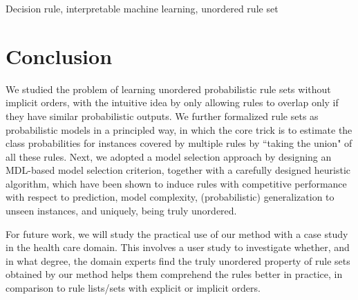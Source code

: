 \documentclass[twoside,11pt]{article}
\begin{document}
\begin{keywords}
  Decision rule, interpretable machine learning, unordered rule set
\end{keywords}












\section{Conclusion}
We studied the problem of learning unordered probabilistic rule sets without implicit orders, with the intuitive idea by only allowing rules to overlap only if they have similar probabilistic outputs. We further formalized rule sets as probabilistic models in a principled way, in which the core trick is to estimate the class probabilities for instances covered by multiple rules by ``taking the union" of all these rules. Next, we adopted a model selection approach by designing an MDL-based model selection criterion, together with a carefully designed heuristic algorithm, which have been shown to induce rules with competitive performance with respect to prediction, model complexity, (probabilistic) generalization to unseen instances, and uniquely, being truly unordered. 

For future work, we will study the practical use of our method with a case study in the health care domain. This involves a user study to investigate whether, and in what degree, the domain experts find the truly unordered property of rule sets obtained by our method helps them comprehend the rules better in practice, in comparison to rule lists/sets with explicit or implicit orders.


\end{document}
